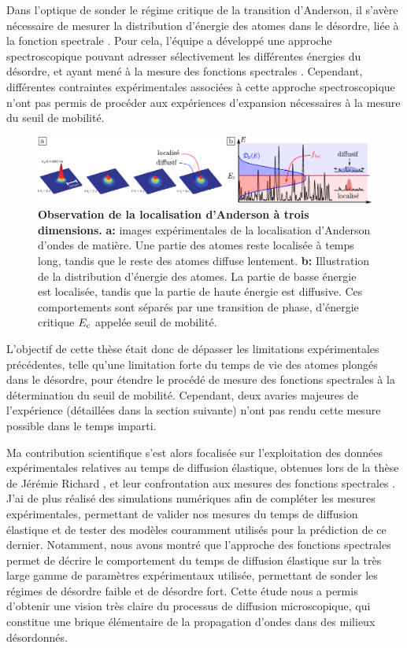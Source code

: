 Dans l'optique de sonder le régime critique de la transition d'Anderson, il s'avère nécessaire de mesurer la distribution d'énergie des atomes dans le désordre, liée à la fonction spectrale \citep{pasek2017anderson}. Pour cela, l'équipe a développé une approche spectroscopique pouvant adresser sélectivement les différentes énergies du désordre, et ayant mené à la mesure des fonctions spectrales \citep{denechaud2018vers,volchkov2018measurement}. Cependant, différentes contraintes expérimentales associées à cette approche spectroscopique n'ont pas permis de procéder aux expériences d'expansion nécessaires à la mesure du seuil de mobilité.

\begin{figure}
\centering
\includegraphics[width=\textwidth]{Fig/Introduction/AL3D.pdf}
\caption{\textbf{Observation de la localisation d'Anderson à trois dimensions.} \textbf{a:} images expérimentales de la localisation d'Anderson d'ondes de matière. Une partie des atomes reste localisée à temps long, tandis que le reste des atomes diffuse lentement. \textbf{b:} Illustration de la distribution d'énergie des atomes. La partie de basse énergie est localisée, tandis que la partie de haute énergie est diffusive. Ces comportements sont séparés par une transition de phase, d'énergie critique $E_{\mathrm{c}}$ appelée seuil de mobilité.}
\label{fig:AL3D}
\end{figure}

L'objectif de cette thèse était donc de dépasser les limitations expérimentales précédentes, telle qu'une limitation forte du temps de vie des atomes plongés dans le désordre, pour étendre le procédé de mesure des fonctions spectrales à la détermination du seuil de mobilité. Cependant, deux avaries majeures de l'expérience (détaillées dans la section suivante) n'ont pas rendu cette mesure possible dans le temps imparti. 

Ma contribution scientifique s'est alors focalisée sur l'exploitation des données expérimentales relatives au temps de diffusion élastique, obtenues lors de la thèse de Jérémie Richard \citep{richard2015propagation,richard2019elastic}, et leur confrontation aux mesures des fonctions spectrales \citep{signoles2019ultracold}. J'ai de plus réalisé des simulations numériques afin de compléter les mesures expérimentales, permettant de valider nos mesures du temps de diffusion élastique et de tester des modèles couramment utilisés pour la prédiction de ce dernier. Notamment, nous avons montré que l'approche des fonctions spectrales permet de décrire le comportement du temps de diffusion élastique sur la très large gamme de paramètres expérimentaux utilisée, permettant de sonder les régimes de désordre faible et de désordre fort. Cette étude nous a permis d'obtenir une vision très claire du processus de diffusion microscopique, qui constitue une brique élémentaire de la propagation d'ondes dans des milieux désordonnés.






